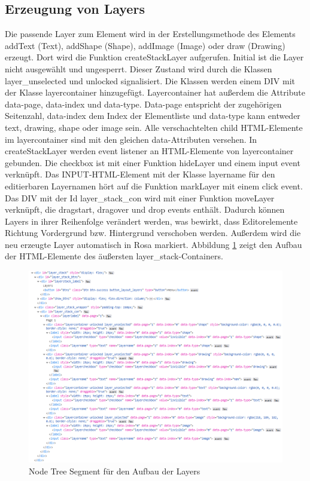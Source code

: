 \subsection{Erzeugung von Layers}
Die passende Layer zum Element wird in der Erstellungsmethode des Elements addText (Text), addShape (Shape), addImage (Image) oder draw (Drawing) erzeugt. Dort wird die Funktion  createStackLayer aufgerufen. Initial ist die Layer nicht ausgewählt und ungesperrt. Dieser Zustand wird durch die Klassen layer\_unselected und unlocked signalisiert. Die Klassen werden einem DIV mit der Klasse layercontainer hinzugefügt. Layercontainer hat außerdem die Attribute data-page, data-index und data-type. Data-page entspricht der zugehörigen Seitenzahl, data-index dem Index der Elementliste und data-type kann entweder text, drawing, shape oder image sein. Alle verschachtelten child HTML-Elemente im layercontainer sind mit den gleichen data-Attributen versehen. In createStackLayer werden event listener an HTML-Elemente von layercontainer gebunden. Die checkbox ist mit einer Funktion hideLayer und einem input event verknüpft. Das INPUT-HTML-Element mit der Klasse layername für den editierbaren Layernamen hört auf die Funktion markLayer mit einem click event. Das DIV mit der Id layer\_stack\_con wird mit einer Funktion moveLayer verknüpft, die dragstart, dragover und drop events enthält. Dadurch können Layers in ihrer Reihenfolge verändert werden, was bewirkt, dass Editorelemente Richtung Vordergrund bzw. Hintergrund verschoben werden. Außerdem wird die neu erzeugte Layer automatisch in Rosa markiert. Abbildung \ref{fig:layer-stack} zeigt den Aufbau der HTML-Elemente des äußersten layer\_stack-Containers.

\begin{figure}[!htbp]
	\centering
	\includegraphics[width=1\textwidth]{"images/layer-stack.png"}
	\caption{Node Tree Segment für den Aufbau der Layers}
	\label{fig:layer-stack}
\end{figure}

